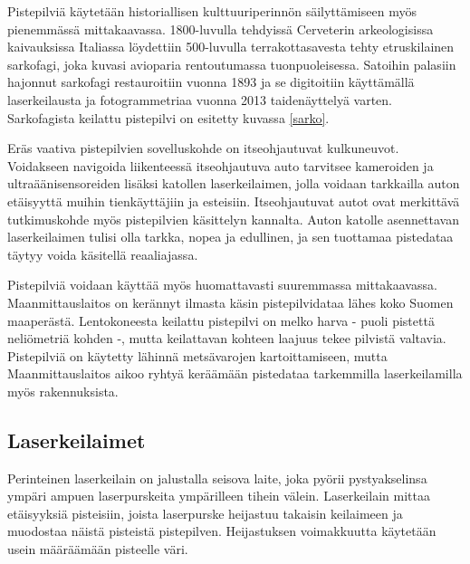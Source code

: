 Pistepilviä käytetään historiallisen kulttuuriperinnön säilyttämiseen myös pienemmässä mittakaavassa. 1800-luvulla tehdyissä Cerveterin arkeologisissa kaivauksissa Italiassa löydettiin 500-luvulla terrakottasavesta tehty etruskilainen sarkofagi, joka kuvasi avioparia rentoutumassa tuonpuoleisessa. Satoihin palasiin hajonnut sarkofagi restauroitiin vuonna 1893 ja se digitoitiin käyttämällä laserkeilausta ja fotogrammetriaa vuonna 2013 taidenäyttelyä varten. Sarkofagista keilattu pistepilvi on esitetty kuvassa \ref{sarko}. \cite{sarkofagi} 

Eräs vaativa pistepilvien sovelluskohde on itseohjautuvat kulkuneuvot. Voidakseen navigoida liikenteessä itseohjautuva auto tarvitsee kameroiden ja ultraäänisensoreiden lisäksi katollen laserkeilaimen, jolla voidaan tarkkailla auton etäisyyttä muihin tienkäyttäjiin ja esteisiin. Itseohjautuvat autot ovat merkittävä tutkimuskohde myös pistepilvien käsittelyn kannalta. Auton katolle asennettavan laserkeilaimen tulisi olla tarkka, nopea ja edullinen, ja sen tuottamaa pistedataa täytyy voida käsitellä reaaliajassa. \cite{car} 

Pistepilviä voidaan käyttää myös huomattavasti suuremmassa mittakaavassa. Maanmittauslaitos on kerännyt ilmasta käsin pistepilvidataa lähes koko Suomen maaperästä. Lentokoneesta keilattu pistepilvi on melko harva - puoli pistettä neliömetriä kohden -, mutta keilattavan kohteen laajuus tekee pilvistä valtavia. Pistepilviä on käytetty lähinnä metsävarojen kartoittamiseen, mutta Maanmittauslaitos aikoo ryhtyä keräämään pistedataa tarkemmilla laserkeilamilla myös rakennuksista. \cite{hs}

\subsection{Laserkeilaimet}\label{laserkeilaimet}

Perinteinen laserkeilain on jalustalla seisova laite, joka pyörii pystyakselinsa ympäri ampuen laserpurskeita ympärilleen tihein välein. Laserkeilain mittaa etäisyyksiä pisteisiin, joista laserpurske heijastuu takaisin keilaimeen ja muodostaa näistä pisteistä pistepilven. Heijastuksen voimakkuutta käytetään usein määräämään pisteelle väri. 

